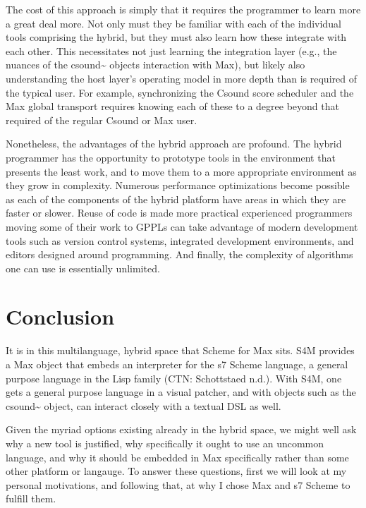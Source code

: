 \documentclass[letterpaper,10pt,english]{sphinxmanual}
\begin{document}
\sphinxAtStartPar
The cost of this approach is simply that it requires the programmer to learn
more \sphinxhyphen{} a great deal more. Not only must they be familiar with each of the individual
tools comprising the hybrid, but they must also learn how these integrate with each other.
This necessitates not just learning the integration layer (e.g., the nuances of the csound\textasciitilde{}
objects interaction with Max), but likely also understanding the host layer’s
operating model in more depth than is required of the typical user.
For example, synchronizing the Csound score scheduler and the Max global
transport requires knowing each of these to a degree beyond that required of the
regular Csound or Max user.

\sphinxAtStartPar
Nonetheless, the advantages of the hybrid approach are profound.
The hybrid programmer has the opportunity to prototype tools in the
environment that presents the least work, and to move them to a more
appropriate environment as they grow in complexity.
Numerous performance optimizations become possible as each of the
components of the hybrid platform have areas in which they are faster or slower.
Reuse of code is made more practical \sphinxhyphen{} experienced programmers
moving some of their work to GPPLs can take
advantage of modern development tools such as version control systems,
integrated development environments, and
editors designed around programming. And finally, the complexity
of algorithms one can use is essentially unlimited.


\section{Conclusion}
\label{\detokenize{background:conclusion}}
\sphinxAtStartPar
It is in this multi\sphinxhyphen{}language, hybrid space that Scheme for Max sits.
S4M provides a Max object that embeds an interpreter for
the s7 Scheme language, a general purpose language in the Lisp family
(CTN: Schottstaed n.d.).
With S4M, one gets a general purpose language in a visual patcher, and
with objects such as the csound\textasciitilde{} object, can interact closely with
a textual DSL as well.

\sphinxAtStartPar
Given the myriad options existing already in the hybrid space,
we might well ask why a new tool is justified, why
specifically it ought to use an uncommon language, and why it should
be embedded in Max specifically rather than some other platform or langauge.
To answer these questions, first we will look at my personal motivations,
and following that, at why I chose Max and s7 Scheme to fulfill them.
\end{document}
